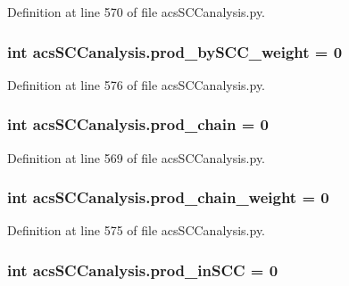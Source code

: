 Definition at line 570 of file acs\-S\-C\-Canalysis.\-py.

\hypertarget{a00096_a5f45dbe461b3b18021c93780e87cc40e}{
\subsubsection[{prod\-\_\-by\-S\-C\-C\-\_\-weight}]{\setlength{\rightskip}{0pt plus 5cm}int acs\-S\-C\-Canalysis.\-prod\-\_\-by\-S\-C\-C\-\_\-weight = 0}}\label{a00096_a5f45dbe461b3b18021c93780e87cc40e}


Definition at line 576 of file acs\-S\-C\-Canalysis.\-py.

\hypertarget{a00096_ab307c6047e4d16ec0335266b24e7db5a}{
\subsubsection[{prod\-\_\-chain}]{\setlength{\rightskip}{0pt plus 5cm}int acs\-S\-C\-Canalysis.\-prod\-\_\-chain = 0}}\label{a00096_ab307c6047e4d16ec0335266b24e7db5a}


Definition at line 569 of file acs\-S\-C\-Canalysis.\-py.

\hypertarget{a00096_a6736365f1f19058f6e1d57287383dbcc}{
\subsubsection[{prod\-\_\-chain\-\_\-weight}]{\setlength{\rightskip}{0pt plus 5cm}int acs\-S\-C\-Canalysis.\-prod\-\_\-chain\-\_\-weight = 0}}\label{a00096_a6736365f1f19058f6e1d57287383dbcc}


Definition at line 575 of file acs\-S\-C\-Canalysis.\-py.

\hypertarget{a00096_adbc76b0558ceb74d798b35146a583474}{
\subsubsection[{prod\-\_\-in\-S\-C\-C}]{\setlength{\rightskip}{0pt plus 5cm}int acs\-S\-C\-Canalysis.\-prod\-\_\-in\-S\-C\-C = 0}}\label{a00096_adbc76b0558ceb74d798b35146a583474}


